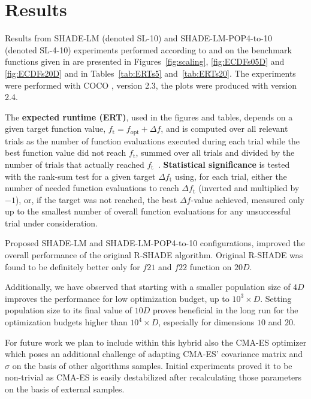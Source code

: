 \documentclass[sigconf]{acmart}
\newcommand{\Df}{\ensuremath{\Delta f}}
\newcommand{\fopt}{\ensuremath{f_\mathrm{opt}}}
\newcommand{\ftarget}{\ensuremath{f_\mathrm{t}}}
\begin{document}
\section{Results}

Results from SHADE-LM (denoted SL-10) and SHADE-LM-POP4-to-10 (denoted SL-4-10) experiments performed according to \cite{hansen2016exp} and \cite{hansen2016perfass} on the
benchmark functions given in \cite{wp200901_2010,hansen2010fun} are
presented in Figures~\ref{fig:scaling}, \ref{fig:ECDFs05D} and
\ref{fig:ECDFs20D} and in Tables~\ref{tab:ERTs5} and~\ref{tab:ERTs20}.
The experiments were performed with COCO \cite{hansen2020cocoplat}, version
{2.3}, the plots were produced with version {2.4}.

The \textbf{expected runtime (ERT)}, used in the figures and tables,
depends on a given target function value, $\ftarget=\fopt+\Df$, and is
computed over all relevant trials as the number of function
evaluations executed during each trial while the best function value
did not reach \ftarget, summed over all trials and divided by the
number of trials that actually reached \ftarget\
\cite{hansen2012exp,price1997dev}.  \textbf{Statistical significance}
is tested with the rank-sum test for a given target $\Delta\ftarget$
using, for each trial,
either the number of needed function evaluations to reach
$\Delta\ftarget$ (inverted and multiplied by $-1$), or, if the target
was not reached, the best $\Df$-value achieved, measured only up to
the smallest number of overall function evaluations for any
unsuccessful trial under consideration.

Proposed SHADE-LM and SHADE-LM-POP4-to-10 configurations,
improved the overall performance of the original R-SHADE algorithm.
Original R-SHADE was found to be definitely better only for $f21$
and $f22$ function on $20D$.

Additionally, we have observed that starting with a smaller population size
of $4D$ improves the performance for low optimization budget,
up to $10^3 \times D$. Setting population size to its final value
of $10D$ proves beneficial in the long run for the optimization
budgets higher than $10^4 \times D$, especially for dimensions $10$
and $20$.

For future work we plan to include within this hybrid also the CMA-ES
optimizer which poses an additional challenge of adapting CMA-ES' covariance
matrix and $\sigma$ on the basis of other algorithms samples.
Initial experiments proved it to be non-trivial as CMA-ES is easily destabilized
after recalculating those parameters on the basis of external samples.
\end{document}
